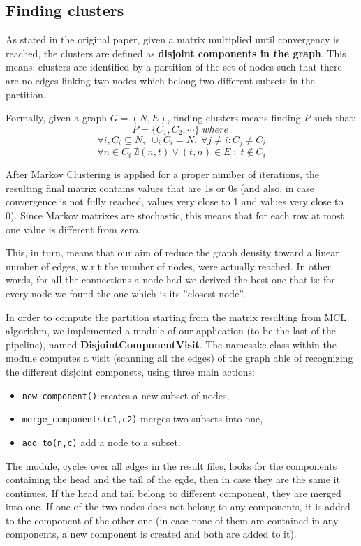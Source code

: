 \subsection{Finding clusters}
\label{findingcluster}
As stated in the original paper, given a matrix
multiplied until convergency is reached, the clusters are
defined as \textbf{disjoint components in the graph}. 
This means, clusters are identified by
a partition of the set of nodes such that there are no edges
linking two nodes which belong two different subsets in the partition.

Formally, given a graph $G = (N,E)$, finding clusters means finding $P$ such that:
$$ P = \{ C_1,C_2, \cdots \} \; where \; $$ 
$$\forall i, C_i \subseteq  N, \; \cup_{i} C_i = N, \; \forall j \neq i : C_j \neq C_i$$
$$ \forall n \in C_i \: \nexists (n,t) \lor (t,n) \in E \; : \; t \notin C_i  $$

After Markov Clustering is applied for a proper number of iterations,
the resulting final matrix contains values that are 1s or 0s 
(and also, in case convergence is not fully reached, values very close to 1 and
values very close to 0).
Since Markov matrixes are stochastic, this means that for each row
at most one value is different from zero.

This, in turn, means that our aim of reduce the graph density toward
a linear number of edges, w.r.t the number of nodes, were  actually reached.
In other words, for all the connections a node had we derived the best one
that is: for every node we found the one which is its ''closest node''.

In order to compute the partition starting from the matrix resulting from MCL algorithm, we implemented a module of our application (to be the last of the pipeline), 
named \textbf{DisjointComponentVisit}.
The namesake class within the module computes a visit (scanning all the edges)
of the graph able of recognizing the different disjoint componets, using three main actions:
\begin{itemize}
    \item \verb!new_component()! creates a new subset of nodes,
    \item \verb!merge_components(c1,c2)! merges two subsets into one,
    \item \verb!add_to(n,c)! add a node to a subset.
\end{itemize}

The module, cycles over all edges in the result files, looks
for the components containing the head and the tail of the egde,
then in case they are the same it continues. If the head and tail
belong to different component, they are merged into one.
If one of the two nodes does not belong to any components, it is
added  to the component of the other one (in case none of them 
are contained in any components, a new component is created and both
are added to it).

